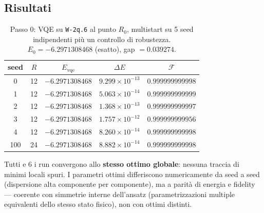 \documentclass[11pt,a4paper]{article}
\begin{document}
\subsection{Risultati}

\begin{table}[htbp]
\centering
\caption{Passo 0: VQE su \texttt{W-2q.6} al punto $R_0$, multistart su 5 seed
indipendenti più un controllo di robustezza. $E_0=-6.2971308468$ (esatto),
gap $=0.039274$.}
\label{tab:passo0}
\begin{tabular}{ccccc}
\toprule
seed & $R$ & $E_\text{vqe}$ & $\Delta E$ & $\mathcal F$ \\
\midrule
0   & 12 & $-6.2971308468$ & $9.299\times10^{-13}$ & $0.999999999998$ \\
1   & 12 & $-6.2971308468$ & $5.063\times10^{-14}$ & $0.999999999999$ \\
2   & 12 & $-6.2971308468$ & $1.368\times10^{-13}$ & $0.999999999997$ \\
3   & 12 & $-6.2971308468$ & $1.757\times10^{-12}$ & $0.999999999956$ \\
4   & 12 & $-6.2971308468$ & $8.260\times10^{-14}$ & $0.999999999998$ \\
100 & 24 & $-6.2971308468$ & $8.882\times10^{-14}$ & $0.999999999998$ \\
\bottomrule
\end{tabular}
\end{table}

Tutti e 6 i run convergono allo \textbf{stesso ottimo globale}: nessuna
traccia di minimi locali spuri. I parametri ottimi differiscono
numericamente da seed a seed (dispersione alta componente per componente),
ma a parità di energia e fidelity --- coerente con simmetrie interne
dell'ansatz (parametrizzazioni multiple equivalenti dello stesso stato
fisico), non con ottimi distinti.



\end{document}
